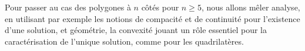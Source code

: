 Pour passer au cas des polygones à $n$ côtés pour $n \geq 5$, nous allons mêler analyse, en utilisant par exemple les notions de compacité et de continuité pour l'existence d'une solution, et géométrie, la convexité jouant un rôle essentiel pour la caractérisation de l'unique solution, comme pour les quadrilatères.
